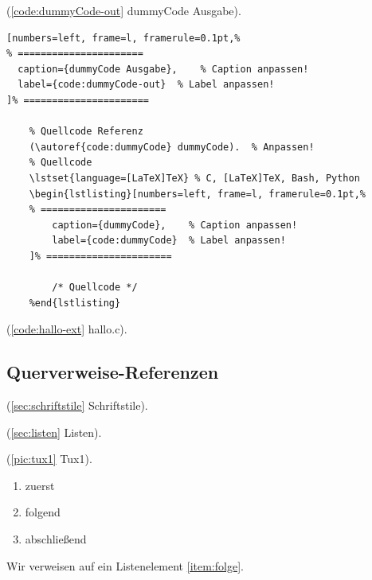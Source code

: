 (\autoref{code:dummyCode-out} dummyCode Ausgabe).  %
\lstset{language=[LaTeX]TeX} %
\begin{lstlisting}[numbers=left, frame=l, framerule=0.1pt,%
% ======================
  caption={dummyCode Ausgabe},    % Caption anpassen!
  label={code:dummyCode-out}  % Label anpassen!
]% ======================

	% Quellcode Referenz
	(\autoref{code:dummyCode} dummyCode).  % Anpassen!
	% Quellcode
	\lstset{language=[LaTeX]TeX} % C, [LaTeX]TeX, Bash, Python
	\begin{lstlisting}[numbers=left, frame=l, framerule=0.1pt,%
	% ======================
		caption={dummyCode},    % Caption anpassen!
		label={code:dummyCode}  % Label anpassen!
	]% ======================

		/* Quellcode */
	%end{lstlisting}
\end{lstlisting}

(\autoref{code:hallo-ext} hallo.c).    %
	\lstset{language=C}%

\newpage %

\subsection{Querverweise-Referenzen}\label{sec:quer-ref}

(\autoref{sec:schriftstile} Schriftstile).

(\autoref{sec:listen} Listen).

(\autoref{pic:tux1} Tux1).

\begin{enumerate}
	\item zuerst
	\item \label{item:folge} folgend
	\item abschließend
\end{enumerate}

Wir verweisen auf ein Listenelement \autoref{item:folge}.

